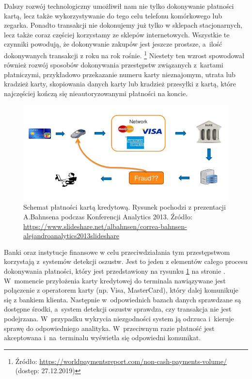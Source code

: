 \documentclass[inzynierska]{pwr_wmat_praca_dyplomowa}
\theoremstyle{plain}
\numberwithin{theorem}{chapter}
\theoremstyle{definition}
\numberwithin{theorem}{chapter}
\begin{document}
Dalszy rozwój technologiczny umożliwił nam nie tylko dokonywanie płatności kartą, lecz także wykorzystywanie do tego celu telefonu komórkowego lub zegarka. Ponadto transakcji nie dokonujemy już tylko w sklepach stacjonarnych, lecz także coraz częściej korzystamy ze sklepów internetowych. Wszystkie te czynniki powodują, że dokonywanie zakupów jest jeszcze prostsze, a~ilość dokonywanych transakcji z roku na rok rośnie. \footnote{Źródło: \url{https://worldpaymentsreport.com/non-cash-payments-volume/} (dostęp: 27.12.2019)} Niestety ten wzrost spowodował również rozwój sposobów dokonywania przestępstw związanych z~kartami płatniczymi, przykładowo przekazanie numeru karty nieznajomym, utrata lub kradzież karty, skopiowania danych karty lub kradzież przesyłki z kartą, które najczęściej kończą się nieautoryzowanymi płatności na koncie.

\begin{figure}[h]
	\includegraphics[width=\linewidth]{images/credit-card-flow.jpg}
	\caption{Schemat płatności kartą kredytową. Rysunek pochodzi z prezentacji A.Bahnsena podczas Konferencji Analytics 2013. Źródło: \url{https://www.slideshare.net/albahnsen/correa-bahnsen-alejandroanalytics2013slideshare}}
	\label{fig:credit-card-flow}
\end{figure}

Banki oraz instytucje finansowe w celu przeciwdziałania tym przestępstwom korzystają z~systemów detekcji oszustw. Jest to jeden z elementów całego procesu dokonywania płatności, który jest przedstawiony na rysunku \ref{fig:credit-card-flow} na stronie \pageref{fig:credit-card-flow}. W~momencie przyłożenia karty kredytowej do terminala nawiązywane jest połączenie z operatorem karty (np. Visa, MasterCard), który dalej komunikuje się z bankiem klienta. Następnie w~odpowiednich bazach danych sprawdzane są dostępne środki, a~system detekcji oszustw sprawdza, czy transakcja nie jest podejrzana. W~przypadku wykrycia niezgodności system ją odrzuca i~kieruje sprawę do odpowiedniego analityka. W~przeciwnym razie płatność jest akceptowana i~na~terminalu wyświetla się odpowiedni komunikat.
\end{document}
